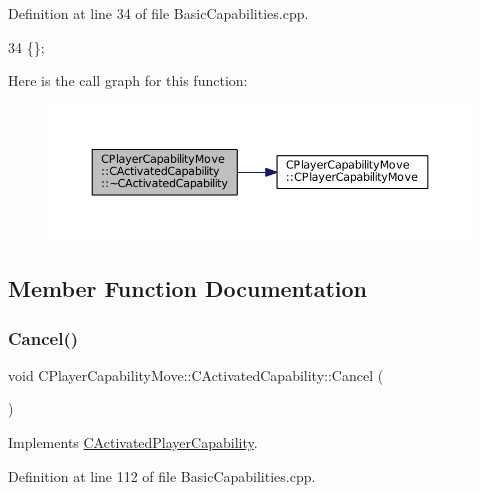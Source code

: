 Definition at line 34 of file Basic\+Capabilities.\+cpp.


\begin{DoxyCode}
34 \{\};
\end{DoxyCode}
Here is the call graph for this function\+:\nopagebreak
\begin{figure}[H]
\begin{center}
\leavevmode
\includegraphics[width=350pt]{classCPlayerCapabilityMove_1_1CActivatedCapability_a32285a6970ff939ebafc8ab9dd84317b_cgraph}
\end{center}
\end{figure}


\subsection{Member Function Documentation}
\hypertarget{classCPlayerCapabilityMove_1_1CActivatedCapability_a6fe1e26646bd14e94ebf7abd0a41cdd3}{}\label{classCPlayerCapabilityMove_1_1CActivatedCapability_a6fe1e26646bd14e94ebf7abd0a41cdd3} 
\subsubsection{\texorpdfstring{Cancel()}{Cancel()}}
{\footnotesize\ttfamily void C\+Player\+Capability\+Move\+::\+C\+Activated\+Capability\+::\+Cancel (\begin{DoxyParamCaption}{ }\end{DoxyParamCaption})\hspace{0.3cm}{\ttfamily [virtual]}}



Implements \hyperlink{classCActivatedPlayerCapability_a5cde83be468e262ad054d81e28684a81}{C\+Activated\+Player\+Capability}.



Definition at line 112 of file Basic\+Capabilities.\+cpp.


